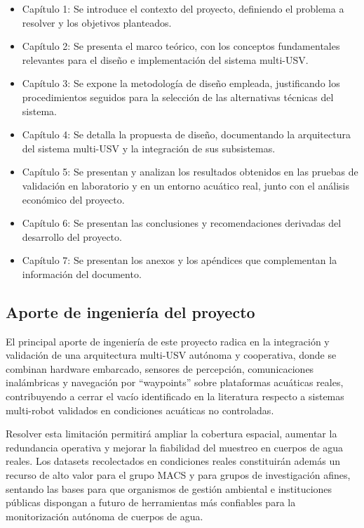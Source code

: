 \begin{itemize}
    \item Capítulo 1: Se introduce el contexto del proyecto, definiendo el problema a resolver y los objetivos planteados.
    \item Capítulo 2: Se presenta el marco teórico, con los conceptos fundamentales relevantes para el diseño e implementación del sistema multi-USV.
    \item Capítulo 3: Se expone la metodología de diseño empleada, justificando los procedimientos seguidos para la selección de las alternativas técnicas del sistema.
    \item Capítulo 4: Se detalla la propuesta de diseño, documentando la arquitectura del sistema multi-USV y la integración de sus subsistemas.
    \item Capítulo 5: Se presentan y analizan los resultados obtenidos en las pruebas de validación en laboratorio y en un entorno acuático real, junto con el análisis económico del proyecto.
    \item Capítulo 6: Se presentan las conclusiones y recomendaciones derivadas del desarrollo del proyecto.
    \item Capítulo 7: Se presentan los anexos y los apéndices que complementan la información del documento.

\end{itemize}

\subsection{Aporte de ingeniería del proyecto}

El principal aporte de ingeniería de este proyecto radica en la integración y validación de una arquitectura multi-USV autónoma y cooperativa, donde se combinan 
hardware embarcado, sensores de percepción, comunicaciones inalámbricas y navegación por \enquote{waypoints} sobre plataformas acuáticas reales, contribuyendo a cerrar el 
vacío identificado en la literatura respecto a sistemas multi-robot validados en condiciones acuáticas no controladas.

Resolver esta limitación permitirá ampliar la cobertura espacial, aumentar la redundancia operativa y mejorar la fiabilidad del muestreo en cuerpos de agua reales. Los 
datasets recolectados en condiciones reales constituirán además un recurso de alto valor para el grupo MACS y para grupos de investigación afines, sentando las bases para 
que organismos de gestión ambiental e instituciones públicas dispongan a futuro de herramientas más confiables para la monitorización autónoma de cuerpos de agua.